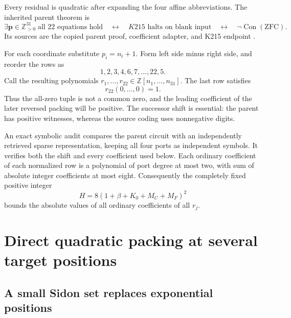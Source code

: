 \documentclass[11pt]{article}
\newcommand{\Z}{\mathbb Z}
\newcommand{\Con}{\operatorname{Con}}
\newcommand{\ZFC}{\mathrm{ZFC}}
\theoremstyle{definition}
\theoremstyle{remark}
\numberwithin{equation}{section}
\begin{document}
Every residual is quadratic after expanding the four affine abbreviations.
The inherited parent theorem is
\begin{equation}\label{eq:parentsemantic}
 \exists\mathbf p\in\Z_{>0}^{31}\;
       \text{all 22 equations hold}
 \quad\longleftrightarrow\quad
 K215\text{ halts on blank input}
 \quad\longleftrightarrow\quad
 \neg\Con(\ZFC).
\end{equation}
Its sources are the copied parent proof, coefficient adapter, and K215
endpoint \cite{package31,k215,native}.

For each coordinate substitute \(p_i=n_i+1\).
Form left side minus right side, and reorder the rows as
\[
 1,2,3,4,6,7,\ldots,22,5.
\]
Call the resulting polynomials \(r_1,\ldots,r_{22}\in\Z[n_1,\ldots,n_{31}]\).
The last row satisfies
\begin{equation}\label{eq:lastconstant}
 r_{22}(0,\ldots,0)=1.
\end{equation}
Thus the all-zero tuple is not a common zero, and the leading coefficient
of the later reversed packing will be positive. The successor shift is
essential: the parent has positive witnesses, whereas the source coding
uses nonnegative digits.

An exact symbolic audit compares the parent circuit with an independently
retrieved sparse representation, keeping all four ports as independent
symbols. It verifies both the shift and every coefficient used below.
Each ordinary coefficient of each normalized row is a polynomial of port
degree at most two, with sum of absolute integer coefficients at most eight.
Consequently the completely fixed positive integer
\begin{equation}\label{eq:H}
 H=8(1+\beta+K_0+M_C+M_F)^2
\end{equation}
bounds the absolute values of all ordinary coefficients of all \(r_j\).

\section{Direct quadratic packing at several target positions}
\label{sec:packing}

\subsection{A small Sidon set replaces exponential positions}
\end{document}

